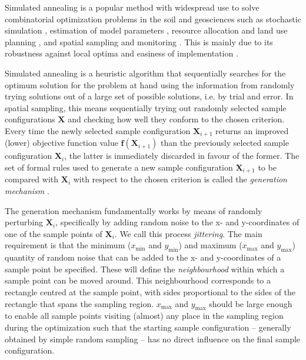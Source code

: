 Simulated annealing is a popular method with widespread use to solve combinatorial optimization problems in the 
soil and geosciences such as stochastic simulation \cite{Deutsch1992, Goovaerts2000}, estimation of model 
parameters \cite{LarkEtAl2003}, resource allocation and land use planning \cite{MuttiahEtAl1996, AertsEtAl2002, 
DuhEtAl2007}, and spatial sampling and monitoring \cite{vanGroenigenEtAl1997, SimbahanEtAl2006, BrusEtAl2007a, 
MarchantEtAl2006, MinasnyEtAl2006b, MellesEtAl2011}. This is mainly due to its robustness against local optima 
and easiness of implementation \cite{MetropolisEtAl1953, KirkpatrickEtAl1983, Cerny1985, AartsEtAl1989, 
Groenigen1999a}.

Simulated annealing is a heuristic algorithm that sequentially searches for the optimum solution for the 
problem at hand using the information  from randomly trying solutions out of a large set of possible 
solutions, i.e. by trial and error. In spatial sampling, this means sequentially trying out randomly selected 
sample configurations $\boldsymbol{X}$ and checking how well they conform to the chosen criterion. Every time 
the newly selected sample configuration $\boldsymbol{X}_{i + 1}$ returns an improved (lower) objective function 
value $\boldsymbol{f}(\boldsymbol{X}_{i + 1})$ than the previously selected sample configuration 
$\boldsymbol{X}_i$, the latter is immediately discarded in favour of the former. The set of formal rules used 
to generate a new sample configuration $\boldsymbol{X}_{i + 1}$ to be compared with $\boldsymbol{X}_i$ with 
respect to the chosen criterion is called the \emph{generation mechanism} \cite{Groenigen1999a, BrusEtAl2007a, 
WebsterEtAl2013}.

The generation mechanism fundamentally works by means of randomly perturbing $\boldsymbol{X}_i$, specifically 
by adding random noise to the x- and y-coordinates of one of the sample points of $\boldsymbol{X}_i$. We call 
this process \emph{jittering}. The main requirement is that the minimum ($x_\text{min}$ and $y_\text{min}$) and 
maximum ($x_\text{max}$ and $y_\text{max}$) quantity of random noise that can be added to the x- and 
y-coordinates of a sample point be specified. These will define the \emph{neighbourhood} within which a sample 
point can be moved around. This neighbourhood corresponds to a rectangle centred at the sample point, with 
sides proportional to the sides of the rectangle that spans the sampling region. $x_\text{max}$ and 
$y_\text{max}$ should be large enough to enable all sample points visiting (almost) any place in the sampling 
region during the optimization such that the starting sample configuration -- generally obtained by simple 
random sampling -- has no direct influence on the final sample configuration.

